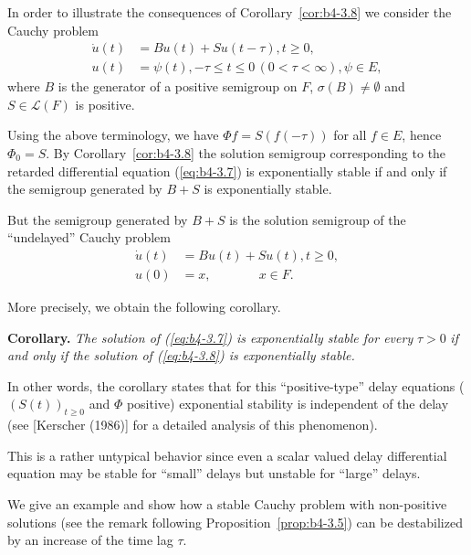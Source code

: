 \begin{example}\label{ex:b4-3.10}
	In order to illustrate the consequences of Corollary~\ref{cor:b4-3.8} we consider the Cauchy problem
	\begin{equation}\label{eq:b4-3.7}
		\begin{aligned}
		\dot{u}(t) &= Bu(t) + Su(t-\tau) , t \geq 0 ,\\
		u(t) &= \psi(t) , -\tau \leq t \leq 0 \,(0 < \tau < \infty) , \psi \in E ,
		\end{aligned}
	\end{equation}
	where $B$ is the generator of a positive semigroup on $F$, $\sigma(B) \neq \emptyset$ and $S \in \mathcal{L}(F)$ is positive.
	
	Using the above terminology, we have $\Phi f = S(f(-\tau))$ for all $f \in E$, hence $\Phi_{0} = S$. 
	By Corollary~\ref{cor:b4-3.8} the solution semigroup corresponding to the retarded differential equation (\ref{eq:b4-3.7}) is exponentially stable if and only if the semigroup generated by $B + S$ is exponentially stable.
	
	But the semigroup generated by $B + S$ is the solution semigroup of the \enquote{undelayed} Cauchy problem
	\begin{equation}\label{eq:b4-3.8}
	\begin{aligned}
		\dot{u}(t) &= Bu(t) + Su(t) , t \geq 0 ,\\
		u(0) &= x , \quad\quad\quad\;\;\, x \in F.
	\end{aligned}
	\end{equation}
\end{example}
More precisely, we obtain the following corollary.

\medskip\noindent
\textbf{Corollary.}
		\textit{The solution of (\ref{eq:b4-3.7}) is exponentially stable for every} $\tau > 0$ \textit{if and only if the solution of (\ref{eq:b4-3.8}) is exponentially stable.}

\medskip	
In other words, the corollary states that for this \enquote{positive-type} delay equations ($(S(t))_{t\geq0}$ and $\Phi$ positive) exponential stability is independent of the delay (see [Kerscher (1986)] for a detailed analysis of this phenomenon).
	
	This is a rather untypical behavior since even a scalar valued delay differential equation may be stable for \enquote{small} delays but unstable for \enquote{large} delays.
	
	We give an example and show how a stable Cauchy problem with non-positive solutions (see the remark following Proposition~\ref{prop:b4-3.5}) can be destabilized by an increase of the time lag $\tau$.
	
